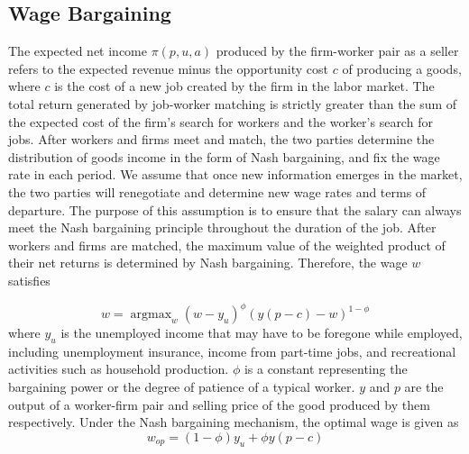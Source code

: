 \documentclass[ %
    final,
    scrbook,
    listoffigures,
    listoftables, 
    glossary]{cu-thesis}
\DeclareMathOperator*{\argmax}{argmax}
\begin{document}
\subsection{Wage Bargaining}
The expected net income $\pi(p,u,a)$ produced by the firm-worker pair as a seller refers to the expected revenue minus the opportunity cost $c$ of producing a goods, where $c$ is the cost of a new job created by the firm in the labor market.
The total return generated by job-worker matching is strictly greater than the sum of the expected cost of the firm's search for workers and the worker's search for jobs. After workers and firms meet and match, the two parties determine the distribution of goods income in the form of Nash bargaining, and fix the wage rate in each period. We assume that once new information emerges in the market, the two parties will renegotiate and determine new wage rates and terms of departure. The purpose of this assumption is to ensure that the salary can always meet the Nash bargaining principle throughout the duration of the job. After workers and firms are matched, the maximum value of the weighted product of their net returns is determined by Nash bargaining. Therefore, the wage $w$ satisfies

\begin{equation} \label{eq1}
w = \argmax_w (w-y_u)^{\phi}(y(p-c)-w)^{1-\phi}
\end{equation}
where $y_u$ is the unemployed income that may have to be foregone while employed, including unemployment insurance, income from part-time jobs, and recreational activities such as household production. $\phi$ is a constant representing the bargaining power or the degree of patience of a typical worker. $y$ and $p$ are the output of a worker-firm pair and selling price of the good produced by them respectively. Under the Nash bargaining mechanism, the optimal wage is given as 
\begin{equation} \label{eq2}
w_{op} = (1-\phi)y_u+\phi y(p-c)
\end{equation}
\end{document}
